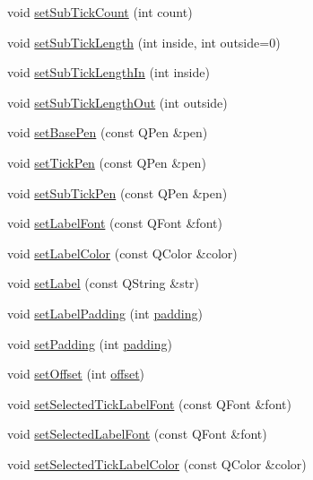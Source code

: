 \begin{DoxyCompactItemize}
\item 
void \hyperlink{class_q_c_p_axis_a4b1554ead9d7f9799650d51383e326dd}{set\-Sub\-Tick\-Count} (int count)
\item 
void \hyperlink{class_q_c_p_axis_ab702d6fd42fc620607435339a1c2a2e1}{set\-Sub\-Tick\-Length} (int inside, int outside=0)
\item 
void \hyperlink{class_q_c_p_axis_ac46fa2a993a9f5789540977610acf1de}{set\-Sub\-Tick\-Length\-In} (int inside)
\item 
void \hyperlink{class_q_c_p_axis_a4c6dfc3963492ed72a77724012df5f23}{set\-Sub\-Tick\-Length\-Out} (int outside)
\item 
void \hyperlink{class_q_c_p_axis_a778d45fb71b3c7ab3bb7079e18b058e4}{set\-Base\-Pen} (const Q\-Pen \&pen)
\item 
void \hyperlink{class_q_c_p_axis_ad80923bcc1c5da4c4db602c5325e797e}{set\-Tick\-Pen} (const Q\-Pen \&pen)
\item 
void \hyperlink{class_q_c_p_axis_aede4028ae7516bd51a60618a8233f9cf}{set\-Sub\-Tick\-Pen} (const Q\-Pen \&pen)
\item 
void \hyperlink{class_q_c_p_axis_a71ac1a47f7547e490a8c4311d1433cf3}{set\-Label\-Font} (const Q\-Font \&font)
\item 
void \hyperlink{class_q_c_p_axis_a6c906fe56d75f0122335b9f79b999608}{set\-Label\-Color} (const Q\-Color \&color)
\item 
void \hyperlink{class_q_c_p_axis_a33bcc382c111c9f31bb0687352a2dea4}{set\-Label} (const Q\-String \&str)
\item 
void \hyperlink{class_q_c_p_axis_a4391192a766e5d20cfe5cbc17607a7a2}{set\-Label\-Padding} (int \hyperlink{class_q_c_p_axis_abb85015a9467ec176e70698307ec833a}{padding})
\item 
void \hyperlink{class_q_c_p_axis_a5691441cb3de9e9844855d339c0db279}{set\-Padding} (int \hyperlink{class_q_c_p_axis_abb85015a9467ec176e70698307ec833a}{padding})
\item 
void \hyperlink{class_q_c_p_axis_a04a652603cbe50eba9969ee6d68873c3}{set\-Offset} (int \hyperlink{class_q_c_p_axis_aebc032ac6eea164a02859c017f52d5e7}{offset})
\item 
void \hyperlink{class_q_c_p_axis_a845ccb560b7bc5281098a5be494145f6}{set\-Selected\-Tick\-Label\-Font} (const Q\-Font \&font)
\item 
void \hyperlink{class_q_c_p_axis_a02ec2a75d4d8401eaab834fbc6803d30}{set\-Selected\-Label\-Font} (const Q\-Font \&font)
\item 
void \hyperlink{class_q_c_p_axis_a9bdbf5e63ab15187f3a1de9440129227}{set\-Selected\-Tick\-Label\-Color} (const Q\-Color \&color)

\end{DoxyCompactItemize}
